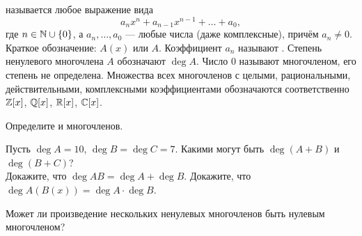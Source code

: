 \documentclass[a4paper, 12pt]{article}
\begin{document}




 
называется любое выражение вида
$$
a_nx^n + a_{n-1}x^{n-1} + \dots  + a_0,  %
$$
где
$n\in\mathbb{N}\cup\{0\}$,
а 
$a_n,\dots ,a_0$ --- любые числа (даже комплексные), прич\"ем $a_n\ne0$.
Краткое обозначение: $A(x)$ или $A$. Коэффициент $a_n$ называют
.
Степень ненулевого многочлена $A$ обозначают $\deg A$.
Число 0 называют  многочленом, его степень не определена.
Множества всех многочленов с целыми, рациональными, действительными, комплексными коэффициентами обозначаются соответственно $\mathbb{Z}[x]$, $\mathbb{Q}[x]$, $\mathbb{R}[x]$, $\mathbb{C}[x]$.

Определите  и  многочленов.

 
 Пусть $\deg A=10$, $\deg B=\deg C=7$. Какими могут быть
$\deg(A+B)$ и $\deg(B+C)$?\\
 Докажите, что $\deg AB=\deg A+\deg B.$
 Докажите, что $\deg A(B(x))=\deg A\cdot \deg B$.

 Может ли произведение нескольких ненулевых многочленов
быть нулевым многочленом?







\end{document}
